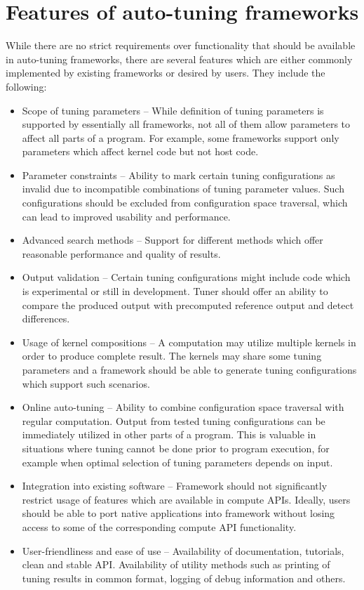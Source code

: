 \documentclass
[
    digital, %
    oneside, %
    table, %
    nolof, %
    nolot, %
    nocover %
]{fithesis3}
\begin{document}
\section{Features of auto-tuning frameworks}
While there are no strict requirements over functionality that should be available in auto-tuning frameworks, there are several features which are either
commonly implemented by existing frameworks or desired by users. They include the following: 
\begin{itemize}
    \item Scope of tuning parameters -- While definition of tuning parameters is supported by essentially all frameworks, not all of them allow parameters
    to affect all parts of a program. For example, some frameworks support only parameters which affect kernel code but not host code.
    \item Parameter constraints -- Ability to mark certain tuning configurations as invalid due to incompatible combinations of tuning parameter values.
    Such configurations should be excluded from configuration space traversal, which can lead to improved usability and performance.
    \item Advanced search methods -- Support for different methods which offer reasonable performance and quality of results.
    \item Output validation -- Certain tuning configurations might include code which is experimental or still in development. Tuner should offer
    an ability to compare the produced output with precomputed reference output and detect differences.
    \item Usage of kernel compositions -- A computation may utilize multiple kernels in order to produce complete result. The kernels may share some
    tuning parameters and a framework should be able to generate tuning configurations which support such scenarios.
    \item Online auto-tuning -- Ability to combine configuration space traversal with regular computation. Output from tested tuning configurations can
    be immediately utilized in other parts of a program. This is valuable in situations where tuning cannot be done prior to program execution, for
    example when optimal selection of tuning parameters depends on input.
    \item Integration into existing software -- Framework should not significantly restrict usage of features which are available in compute APIs.
    Ideally, users should be able to port native applications into framework without losing access to some of the corresponding compute API functionality.
    \item User-friendliness and ease of use -- Availability of documentation, tutorials, clean and stable API. Availability of utility methods such
    as printing of tuning results in common format, logging of debug information and others.
\end{itemize}
\end{document}
